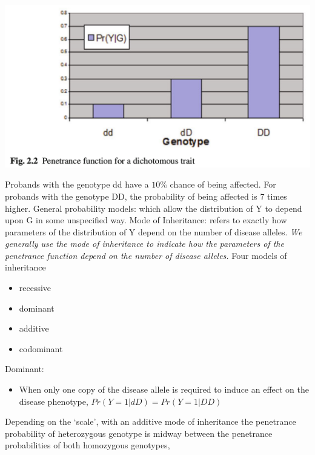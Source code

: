\documentclass[a4paper,twoside,11pt]{article}
\begin{document}
\begin{center}
\includegraphics[scale=0.5]{figure7.png}
\end{center}
Probands with the genotype dd have a $10\%$ chance of being affected. For probands with the genotype DD, the probability of being affected is 7 times higher.
\newline
\newline
\textcolor{NavyBlue}{General probability models: }which allow the distribution of Y to depend upon G in some unspecified way.
\newline
\newline
\textcolor{NavyBlue}{Mode of Inheritance: }refers to exactly how parameters of the distribution of Y depend on the number of disease alleles.
\newline
\newline
\textcolor{NavyBlue}{\textit{We generally use the mode of inheritance to indicate how the parameters of the penetrance function depend on the number of disease alleles.}}
\newline
\newline
Four models of inheritance 
\begin{itemize}
    \item recessive
    \item dominant
    \item additive
    \item codominant
\end{itemize}
\textcolor{NavyBlue}{Dominant: }
\begin{itemize}
    \item When only one copy of the disease allele is required to induce an effect on the disease phenotype, $Pr(Y=1|dD)=Pr(Y=1|DD)$
\end{itemize}
Depending on the ‘scale’, with an additive mode of inheritance the penetrance probability of heterozygous genotype is midway between the penetrance probabilities of both homozygous genotypes,
\end{document}
